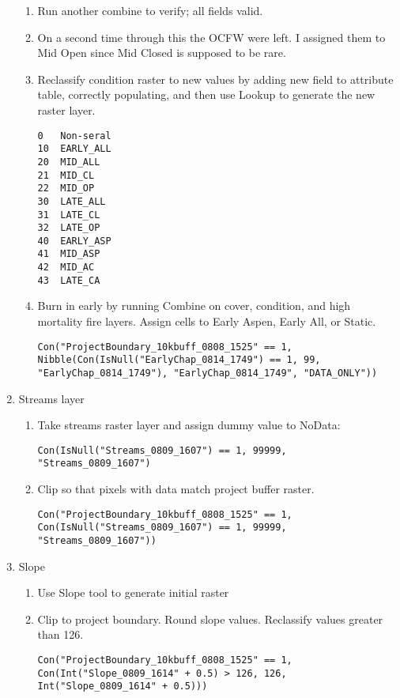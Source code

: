 \begin{enumerate}
\begin{enumerate}
        \item Run another combine to verify; all fields valid.
        \item On a second time through this the OCFW were left. I assigned them to Mid Open since Mid Closed is supposed to be rare.
        \item Reclassify condition raster to new values by adding new field to attribute table, correctly populating, and then use Lookup to generate the new raster layer.
        \begin{verbatim}
0   Non-seral
10  EARLY_ALL
20  MID_ALL
21  MID_CL
22  MID_OP
30  LATE_ALL
31  LATE_CL
32  LATE_OP
40  EARLY_ASP
41  MID_ASP
42  MID_AC
43  LATE_CA
        \end{verbatim}
        \item Burn in early by running Combine on cover, condition, and high mortality fire layers. Assign cells to Early Aspen, Early All, or Static.
        \begin{lstlisting}
Con("ProjectBoundary_10kbuff_0808_1525" == 1, Nibble(Con(IsNull("EarlyChap_0814_1749") == 1, 99, "EarlyChap_0814_1749"), "EarlyChap_0814_1749", "DATA_ONLY")) \end{lstlisting}
    \end{enumerate}
    \item Streams layer
        \begin{enumerate}
        \item Take streams raster layer and assign dummy value to NoData:
        \begin{lstlisting}
Con(IsNull("Streams_0809_1607") == 1, 99999, "Streams_0809_1607") \end{lstlisting}
        \item Clip so that pixels with data match project buffer raster.
        \begin{lstlisting}
Con("ProjectBoundary_10kbuff_0808_1525" == 1, Con(IsNull("Streams_0809_1607") == 1, 99999, "Streams_0809_1607")) \end{lstlisting}
        \end{enumerate}
    \item Slope
    \begin{enumerate}
    \item Use Slope tool to generate initial raster
    \item Clip to project boundary. Round slope values. Reclassify values greater than 126.
    \begin{lstlisting} 
Con("ProjectBoundary_10kbuff_0808_1525" == 1, Con(Int("Slope_0809_1614" + 0.5) > 126, 126, Int("Slope_0809_1614" + 0.5)))

\end{lstlisting}
\end{enumerate}
\end{enumerate}

